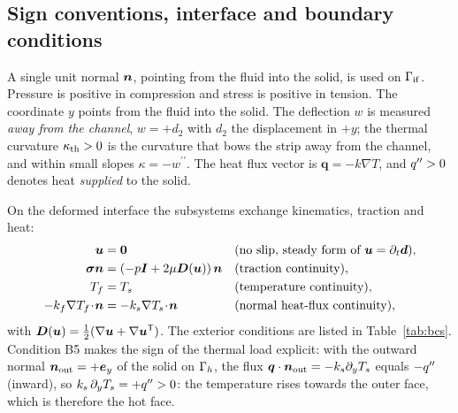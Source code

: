 \subsection{Sign conventions, interface and boundary conditions}
\label{sec:bc}
A single unit normal $\bm{n}$, pointing from the fluid into the solid, is used on $\Gamma_{\mathrm{if}}$.
Pressure is positive in compression and stress is positive in tension. The coordinate $y$ points from
the fluid into the solid. The deflection $w$ is measured \emph{away from the channel},
$w=+d_2$ with $d_2$ the displacement in $+y$; the thermal curvature $\kappa_{\mathrm{th}}>0$ is the curvature that
bows the strip away from the channel, and within small slopes $\kappa=-w^{\prime\prime}$. The heat flux
vector is $\bm q=-k\nabla T$, and $q^{\prime\prime}>0$ denotes heat \emph{supplied} to the solid.

On the deformed interface the subsystems exchange kinematics, traction and heat:
\begin{align}
\bm{u}&=\bm 0 && \text{(no slip, steady form of }\bm{u}=\partial_t\bm{d}), \label{eq:ifkin}\\
\bm{\sigma}\bm{n}&=\left(-p\bm{I}+2\mu\bm{D}(\bm{u})\right)\bm{n} && \text{(traction continuity)}, \label{eq:iftrac}\\
T_f&=T_s && \text{(temperature continuity)}, \label{eq:iftemp}\\
-k_f\nabla T_f\!\cdot\!\bm{n}&=-k_s\nabla T_s\!\cdot\!\bm{n} && \text{(normal heat-flux continuity)}, \label{eq:ifflux}
\end{align}
with $\bm{D}(\bm{u})=\tfrac12(\nabla\bm{u}+\nabla\bm{u}^{\mathsf T})$. The exterior conditions are listed in
Table~\ref{tab:bcs}. Condition B5 makes the sign of the thermal load explicit: with the outward
normal $\bm{n}_{\mathrm{out}}=+\bm e_y$ of the solid on $\Gamma_h$, the flux $\bm q\cdot\bm{n}_{\mathrm{out}}=-k_s\partial_yT_s$
equals $-q^{\prime\prime}$ (inward), so $k_s\,\partial_yT_s=+q^{\prime\prime}>0$: the temperature rises towards the outer
face, which is therefore the hot face.

